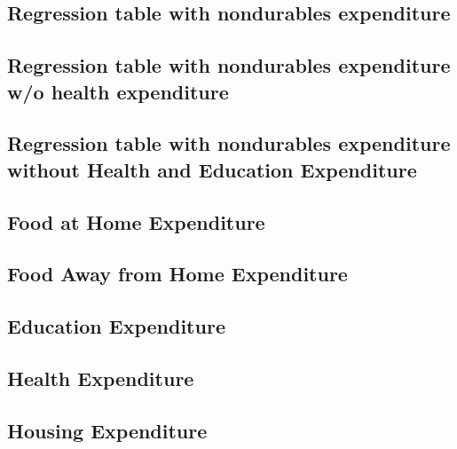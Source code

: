 \documentclass[a4paper,landscape]{article}
\begin{document}
\subsection{Regression table with nondurables expenditure }

\clearpage

\subsection{Regression table with nondurables expenditure w/o health expenditure} 

\clearpage

\subsection{Regression table with nondurables expenditure without Health and Education Expenditure}

\clearpage




\subsection{Food at Home Expenditure}

\clearpage

\subsection{Food Away from Home Expenditure}

\clearpage

\subsection{Education Expenditure}

\clearpage

\subsection{Health Expenditure}

\clearpage

\subsection{Housing Expenditure}

\clearpage
\end{document}
